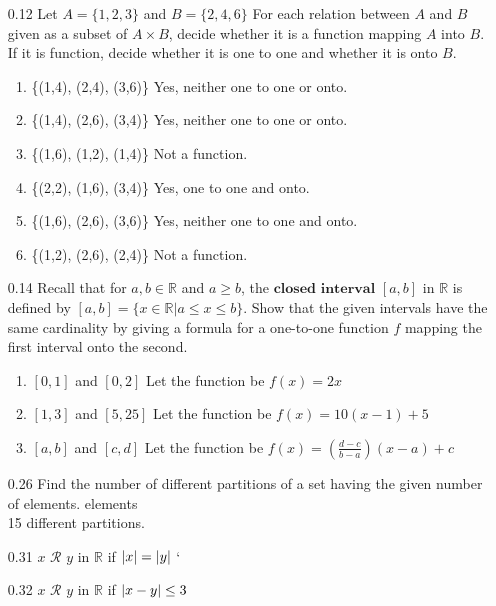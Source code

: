 \documentclass[12pt]{article}
\newcommand{\R}{\mathbb{R}}
\DeclarePairedDelimiter\abs{\lvert}{\rvert}
\begin{document}
\begin{enumerate}
	\item[0.12] Let $A = \{1,2,3\}$ and $B = \{2,4,6\}$ For each relation between $A$ and $B$ given as a subset of $ A \times B$, decide whether it is a function mapping $A$ into $B$. If it is function, decide whether it is one to one and whether it is onto $B$.
	\begin{enumerate}
		\item \{(1,4), (2,4), (3,6)\} \quad Yes, neither one to one or onto.
		\item \{(1,4), (2,6), (3,4)\} \quad Yes, neither one to one or onto.
		\item \{(1,6), (1,2), (1,4)\} \quad Not a function.
		\item \{(2,2), (1,6), (3,4)\} \quad Yes, one to one and onto.
		\item \{(1,6), (2,6), (3,6)\} \quad Yes, neither one to one and onto.
		\item \{(1,2), (2,6), (2,4)\} \quad Not a function.
	\end{enumerate}

		\item[0.14] Recall that for $a,b \in \R$ and $a \geq b$, the $\textbf{closed interval } [a,b]$ in $\R$ is defined by $[a,b] = \{x\in \R|a\leq x \leq b \}$. Show that the given intervals have the same cardinality by giving a formula for a one-to-one function $f$ mapping the first interval onto the second.
	\begin{enumerate}
		\item $[0,1]$ and $[0,2]$ \quad	Let the function be $f(x)=2x$
		\item $[1,3]$ and $[5,25]$ \quad Let the function be $f(x)=10(x-1)+5$
		\item $[a,b]$ and $[c,d]$ \quad	Let the function be $f(x)=(\frac{d-c}{b-a})(x-a)+c$
	\end{enumerate}
	
	\item[0.26] Find the number of different partitions of a set having the given number of elements. elements \\
		15 different partitions.
	\item[0.31] $x$ $\mathscr{R} $ $y$ in $\R$ if $\abs{x} = \abs{y}$
		`
	\item[0.32]  $x$ $\mathscr{R} $ $y$ in $\R$ if $\abs{x-y} \leq 3$
	

\end{enumerate}
\end{document}
